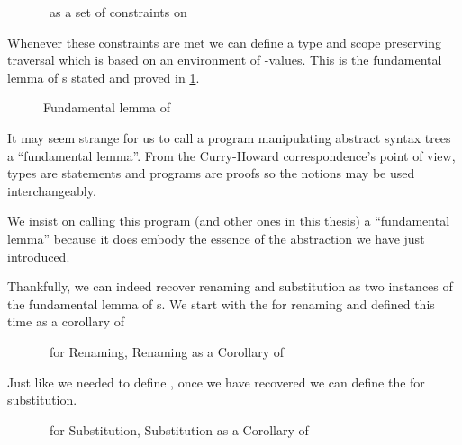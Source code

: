 \begin{figure}[h]
\caption{~as a set of constraints on }
\end{figure}

Whenever these constraints are met we can define a type and scope
preserving traversal which is based on an environment of -values.
This is the fundamental lemma of s stated and proved in \cref{fig:kitlemma}.

\begin{figure}[h]
\caption{Fundamental lemma of \label{fig:kitlemma}}
\end{figure}

\begin{convention}
It may seem strange for us to call a program manipulating abstract syntax trees
a ``fundamental lemma''. From the Curry-Howard correspondence's point of view,
types are statements and programs are proofs so the notions may be used
interchangeably.

We insist on calling this program  (and other ones in this thesis) a
``fundamental lemma'' because it does embody the essence of the abstraction
we have just introduced.
\end{convention}

Thankfully, we can indeed recover renaming and substitution as two instances of
the fundamental lemma of s. We start with the  for renaming
and  defined this time as a corollary of 

\begin{figure}[h]
\begin{minipage}[t]{0.4\textwidth}
\end{minipage}
\begin{minipage}[t]{0.6\textwidth}
\end{minipage}
\caption{~for Renaming, Renaming as a Corollary of \label{fig:renkit}}
\end{figure}

Just like we needed  to define , once we have recovered 
we can define the  for substitution.

\begin{figure}[h]
\begin{minipage}[t]{0.4\textwidth}
\end{minipage}
\begin{minipage}[t]{0.6\textwidth}
\end{minipage}
\caption{~for Substitution, Substitution as a Corollary of \label{fig:subkit}}
\end{figure}


